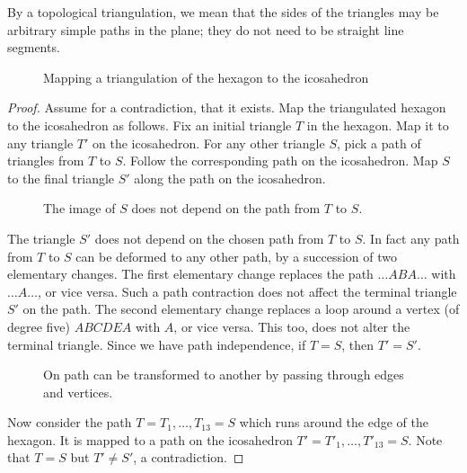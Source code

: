 By a topological triangulation, we mean that the sides of the
triangles may be arbitrary simple paths in the plane; they do not
need to be straight line segments.

\begin{figure}[htb]
  \centering
  \caption{Mapping a triangulation of the hexagon to
the icosahedron}
  \label{fig:th:A}
\end{figure}

\begin{proof}  Assume for a contradiction, that it exists.  Map
the triangulated hexagon to the icosahedron as follows.  Fix an
initial triangle $T$ in the hexagon.  Map it to any triangle $T'$
on the icosahedron.  For any other triangle $S$, pick a path of
triangles from $T$ to $S$.  Follow the corresponding path on the
icosahedron.  Map $S$ to the final triangle $S'$ along the path on
the icosahedron.

\begin{figure}[htb]
  \centering
  \caption{The image of $S$ does not depend on the
path from $T$ to $S$.}
  \label{fig:th:B}
\end{figure}

The triangle $S'$ does not depend on the chosen path from $T$ to
$S$.  In fact any path from $T$ to $S$ can be deformed to any
other path, by a succession of two elementary changes. The first
elementary change replaces the path $\ldots ABA\ldots $ with
$\ldots A\ldots$, or vice versa.  Such a path contraction does not
affect the terminal triangle $S'$ on the path.  The second
elementary change replaces a loop around a vertex (of degree five)
$ABCDEA$ with $A$, or vice versa.  This too, does not alter the
terminal triangle.  Since we have path independence, if $T=S$,
then $T'=S'$.

\begin{figure}[htb]
  \centering
  \caption{On path can be transformed to another by
passing through edges and vertices.}
  \label{fig:th:C}
\end{figure}

Now consider the path $T=T_1,\ldots,T_{13}=S$ which runs around
the edge of the hexagon.  It is mapped to a path on the
icosahedron $T'=T'_1,\ldots,T'_{13}=S$.  Note that $T=S$ but
$T'\ne S'$, a contradiction.
\end{proof}

